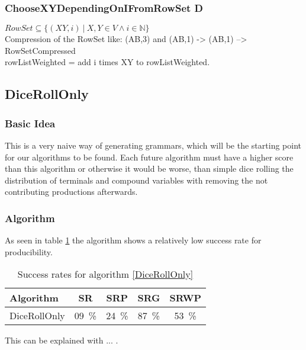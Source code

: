 \subsubsection{ChooseXYDependingOnIFromRowSet D}
$RowSet \subseteq \{(XY,i)\ |\ X,Y \in V \wedge i \in \mathbb{N} \}$\\
Compression of the RowSet like: (AB,3) and (AB,1) -> (AB,1) --> RowSetCompressed\\
rowListWeighted = add i times XY to rowListWeighted.

\pagebreak
\subsection{DiceRollOnly}
\subsubsection{Basic Idea}
\noindent This is a very naive way of generating grammars, which will be the starting point for our algorithms to be found. Each future algorithm must have a higher score than this algorithm or otherwise it would be worse, than simple dice rolling the distribution of terminals and compound variables with removing the not contributing productions afterwards.
\subsubsection{Algorithm}

\noindent
{}
As seen in table \ref{DiceRollOnlySR} the algorithm shows a relatively low success rate for producibility.
\begin{table}[H]
\centering
	\begin{tabular}{ | l || c |c |c |c | }
	\hline
	Algorithm 		& SR 	& SRP 	& SRG 	& SRWP   	\\ \hline
	\hline
	DiceRollOnly 	& 09~\%	& 24~\% & 87~\% & 53~\%		\\ \hline
	\end{tabular}
	\caption{Success rates for algorithm \ref{DiceRollOnly}}
	\label{DiceRollOnlySR}
\end{table}
\noindent This can be explained with ... . 

